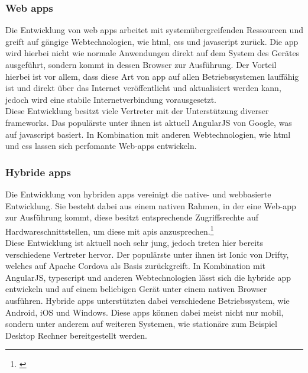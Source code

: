 \subsubsection{Web \glspl{app}}\label{web}

Die Entwicklung von web \glspl{app} arbeitet mit systemübergreifenden Ressourcen und greift auf gängige Webtechnologien, wie \gls{html}, \gls{css} und \gls{javascript} zurück. Die \gls{app} wird hierbei nicht wie normale Anwendungen direkt auf dem System des Gerätes ausgeführt, sondern kommt in dessen Browser zur Ausführung. Der Vorteil hierbei ist vor allem, dass diese Art von \gls{app} auf allen Betriebssystemen lauffähig ist und direkt über das Internet veröffentlicht und aktualisiert werden kann, jedoch wird eine stabile Internetverbindung vorausgesetzt.\\
Diese Entwicklung besitzt viele Vertreter mit der Unterstützung diverser \glspl{framework}. Das populärste unter ihnen ist aktuell AngularJS von Google, was auf \gls{javascript} basiert. In Kombination mit anderen Webtechnologien, wie \gls{html} und \gls{css} lassen sich perfomante Web-\glspl{app} entwickeln.

\subsubsection{Hybride \glspl{app}}\label{hybride}

Die Entwicklung von hybriden \glspl{app} vereinigt die native- und webbasierte Entwicklung. Sie besteht dabei aus einem nativen Rahmen, in der eine Web-\gls{app} zur Ausführung kommt, diese besitzt entsprechende Zugriffsrechte auf Hardwareschnittstellen, um diese mit \glspl{api} anzusprechen.\footnote{\citep[vgl.][Native App, Web App und Hybrid App im Überblick]{PetraRiepe.NativeApp}\label{note37}}\\
Diese Entwicklung ist aktuell noch sehr jung, jedoch treten hier bereits verschiedene Vertreter hervor. Der populärste unter ihnen ist Ionic von Drifty, welches auf Apache Cordova als Basis zurückgreift. In Kombination mit AngularJS, \gls{typescript} und anderen Webtechnologien lässt sich die hybride \gls{app} entwickeln und auf einem beliebigen Gerät unter einem nativen Browser ausführen. Hybride \glspl{app} unterstützten dabei verschiedene Betriebssystem, wie Android, iOS und Windows. Diese \glspl{app} können dabei meist nicht nur mobil, sondern unter anderem auf weiteren Systemen, wie stationäre zum Beispiel Desktop Rechner bereitgestellt werden.

